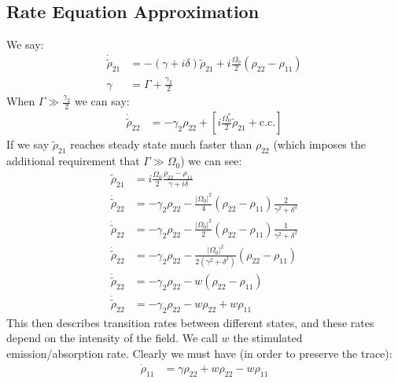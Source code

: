 \subsection{Rate Equation Approximation}
We say:
\begin{align*}
	\dot{\tilde{\rho}}_{21} &= -(\gamma + i\delta) \tilde{\rho}_{21} + i\frac{\Omega_0}{2} (\rho_{22} - \rho_{11}) \\
	\gamma &= \Gamma + \frac{\gamma_2}{2}
\end{align*}
When $\Gamma \gg \frac{\gamma_2}{2}$ we can say:
\begin{align*}
	\dot{\tilde{\rho}}_{22} &= -\gamma_2\rho_{22} + \left[i\frac{\Omega_0^*}{2} \tilde{\rho}_{21} + \text{c.c.}\right]
\end{align*}
If we say $\tilde{\rho}_{21}$ reaches steady state much faster than $\rho_{22}$ (which imposes the additional requirement that $\Gamma \gg \Omega_0$) we can see:
\begin{align*}
	\tilde{\rho}_{21} &= i\frac{\Omega_0}{2} \frac{\rho_{22} - \rho_{11}}{\gamma + i\delta} \\
	\dot{\tilde{\rho}}_{22} &= -\gamma_2\rho_{22} - \frac{|\Omega_0|^2}{4} (\rho_{22} - \rho_{11}) \frac{2}{\gamma^2 + \delta^2} \\
	\dot{\tilde{\rho}}_{22} &= -\gamma_2\rho_{22} - \frac{|\Omega_0|^2}{2} (\rho_{22} - \rho_{11}) \frac{1}{\gamma^2 + \delta^2} \\
	\dot{\tilde{\rho}}_{22} &= -\gamma_2\rho_{22} - \frac{|\Omega_0|^2}{2(\gamma^2 + \delta^2)} (\rho_{22} - \rho_{11}) \\
	\dot{\tilde{\rho}}_{22} &= -\gamma_2\rho_{22} - w (\rho_{22} - \rho_{11}) \\
	\dot{\tilde{\rho}}_{22} &= -\gamma_2\rho_{22} - w \rho_{22} + w\rho_{11}
\end{align*}
This then describes transition rates between different states, and these rates depend on the intensity of the field. We call $w$ the stimulated emission/absorption rate. Clearly we must have (in order to preserve the trace):
\begin{align*}
	\dot{\rho}_{11} &= \gamma\rho_{22} + w\rho_{22} - w\rho_{11}
\end{align*}
